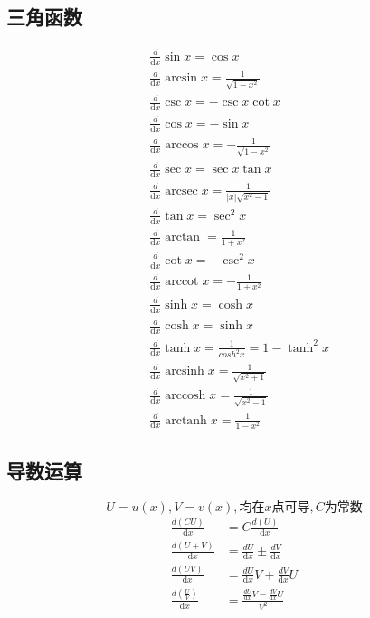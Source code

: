 \subsection{三角函数}
\begin{align}
&\frac{d}{\mathrm{d}{x}}\sin x = \cos x \label{derivative_sin}\\
&\frac{d}{\mathrm{d}{x}}\arcsin x = \frac{1}{\sqrt{1-x^2}} \label{derivative_arcsin}\\
&\frac{d}{\mathrm{d}{x}}\csc x = -\csc x\cot x \label{derivative_csc}\\
&\frac{d}{\mathrm{d}{x}}\cos x = -\sin x \label{derivative_cos}\\
&\frac{d}{\mathrm{d}{x}}\arccos x = -\frac{1}{\sqrt{1-x^2}} \label{derivative_arccos}\\
&\frac{d}{\mathrm{d}{x}}\sec x = \sec x\tan x \label{derivative_sec}\\
&\frac{d}{\mathrm{d}{x}}\operatorname{arcsec}{x}=\frac{1}{\left|x\right|\sqrt{x^2-1}} \label{derivative_arcsec}\\
&\frac{d}{\mathrm{d}{x}}\tan x = \sec^2x \label{derivative_tan}\\
&\frac{d}{\mathrm{d}{x}}\arctan = \frac{1}{1+x^2} \label{derivative_arctan}\\
&\frac{d}{\mathrm{d}{x}}\cot x = -\csc^2x \label{derivative_cot}\\
&\frac{d}{\mathrm{d}{x}}\operatorname{arccot}{x} = -\frac{1}{1+x^2}\label{derivative_arccot}\\
&\frac{d}{\mathrm{d}{x}}\sinh x = \cosh x \label{derivative_sinh}\\
&\frac{d}{\mathrm{d}{x}}\cosh x = \sinh x \label{derivative_cosh}\\
&\frac{d}{\mathrm{d}{x}}\tanh x = \frac{1}{cosh^2 x}=1-\tanh^2x \label{derivative_tanh}\\
&\frac{d}{\mathrm{d}{x}}\operatorname{arcsinh}{x} =\frac{1}{\sqrt{x^2+1}} \label{derivative_arcsinh}\\
&\frac{d}{\mathrm{d}{x}}\operatorname{arccosh}{x} =\frac{1}{\sqrt{x^2-1}} \label{derivative_arccosh}\\
&\frac{d}{\mathrm{d}{x}}\operatorname{arctanh}{x} =\frac{1}{1-x^2} \label{derivative_arctanh}
\end{align}

\subsection{导数运算}
$$U=u(x),V=v(x),\mbox{均在}x\mbox{点可导},C\mbox{为常数}$$
\begin{align}
  \frac{d(CU)}{\mathrm{d}{x}}&= C\frac{d(U)}{\mathrm{d}{x}}\label{limit_operation_1}\\
  \frac{d(U+V)}{\mathrm{d}{x}}&=\frac{dU}{\mathrm{d}{x}}\pm \frac{dV}{\mathrm{d}{x}}\label{limit_operation_2}\\
  \frac{d(UV)}{\mathrm{d}{x}}&=\frac{dU}{\mathrm{d}{x}}V+\frac{dV}{\mathrm{d}{x}}U\label{limit_operation_3}\\
  \frac{d(\frac{U}{V})}{\mathrm{d}{x}}&=\frac{\frac{dU}{\mathrm{d}{x}}V-\frac{dV}{\mathrm{d}{x}}U}{V^2}\label{limit_operation_4}
\end{align}
